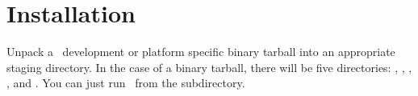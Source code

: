 \documentclass[twoside,twocolumn,9pt]{extarticle}
\begin{document}
% 
% 

\section{Installation}

Unpack a \goo\ development or platform specific binary tarball into an
appropriate staging directory.  In the case of a binary tarball, there
will be five directories: , , ,
, and .  You can just run \goo\ from the
 subdirectory.
\end{document}

